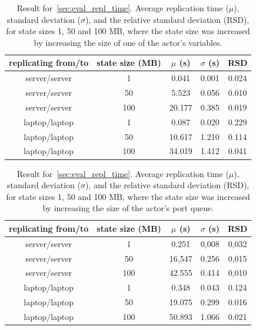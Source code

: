 \documentclass{cslthse-msc}
\begin{document}
 \begin{table}[h!]
	\begin{center}
	\begin{tabular}{| c | c | c | c | c |}
	 \hline
	 replicating from/to & state size (MB) & $\mu$ (s) & $\sigma$ (s) & RSD \\
	 \hline		%
	  server/server & 1 & 0.041 & 0.001 & 0.024 \\
	  server/server & 50 &  5.523 &  0.056 & 0.010 \\
	  server/server & 100 &  20.177 & 0.385 & 0.019 \\
	  laptop/laptop & 1 & 0.087 & 0.020 & 0.229 \\
	  laptop/laptop & 50 & 10.617 & 1.210 & 0.114 \\
	  laptop/laptop & 100 & 34.019 & 1.412 & 0.041 \\
	   \hline
	\end{tabular}
	 \caption[Average replication time, standard deviation and RSD in~\cref{sec:eval_repl_time}, increased variable size]{Result for~\cref{sec:eval_repl_time}. Average replication time ($\mu$), standard deviation ($\sigma$), and the relative standard deviation (RSD), for state sizes 1, 50 and 100 MB, where the state size was increased by increasing the size of one of the actor's variables.}
	 \label{table:replication_time_variation_variable}
	 \end{center}
 \end{table}
 
\begin{table}[h!]
	\begin{center}
	\begin{tabular}{| c | c | c | c | c |}
	 \hline
	 replicating from/to & state size (MB) & $\mu$ (s) & $\sigma$ (s) & RSD \\
	 \hline		%
	  server/server & 1 & 0.251 & 0,008 & 0,032 \\
	  server/server & 50 & 16,547 & 0.256 & 0,015 \\
	  server/server & 100 & 42.555 & 0.414 & 0,010 \\
	  laptop/laptop & 1 & 0.348 & 0.043 & 0.124 \\
	  laptop/laptop & 50 & 19.075 & 0.299 & 0.016 \\
	  laptop/laptop & 100 & 50.893 & 1.066 & 0.021 \\
	   \hline
	\end{tabular}
	 \caption[Average replication time, standard deviation and RSD in~\cref{sec:eval_repl_time}, increased queue size]{Result for~\cref{sec:eval_repl_time}. Average replication time ($\mu$), standard deviation ($\sigma$), and the relative standard deviation (RSD), for state sizes 1, 50 and 100 MB, where the state size was increased by increasing the size of the actor's port queue.}
	 \label{table:replication_time_variation_queue}
	 \end{center}
 \end{table}
 
\end{document}
